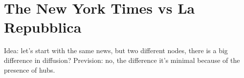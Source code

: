 
\section{The New York Times vs La Repubblica }

Idea: let's start with the same news, but two different nodes, there is a big difference in diffusion?
Prevision: no, the difference it's minimal because of the presence of hubs.





    
